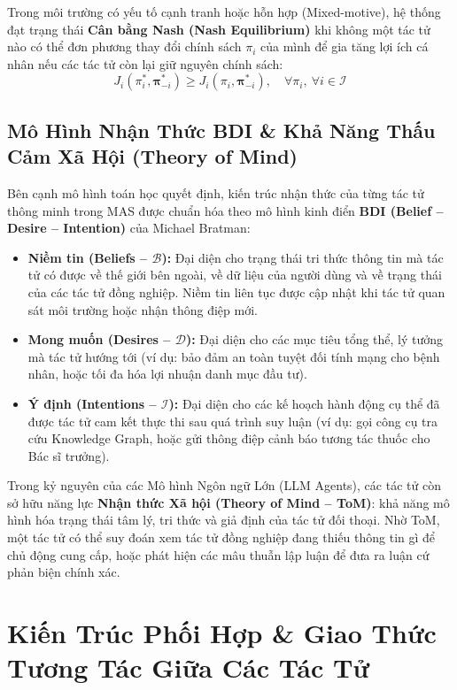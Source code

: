 \documentclass[12pt,a4paper]{report}
\begin{document}
Trong môi trường có yếu tố cạnh tranh hoặc hỗn hợp (Mixed-motive), hệ thống đạt trạng thái \textbf{Cân bằng Nash (Nash Equilibrium)} khi không một tác tử nào có thể đơn phương thay đổi chính sách $\pi_i$ của mình để gia tăng lợi ích cá nhân nếu các tác tử còn lại giữ nguyên chính sách:
\begin{equation}
    J_i(\pi_i^*, \boldsymbol{\pi}_{-i}^*) \ge J_i(\pi_i, \boldsymbol{\pi}_{-i}^*), \quad \forall \pi_i, \ \forall i \in \mathcal{I}
\end{equation}

\subsection{Mô Hình Nhận Thức BDI \& Khả Năng Thấu Cảm Xã Hội (Theory of Mind)}
Bên cạnh mô hình toán học quyết định, kiến trúc nhận thức của từng tác tử thông minh trong MAS được chuẩn hóa theo mô hình kinh điển \textbf{BDI (Belief -- Desire -- Intention)} của Michael Bratman:
\begin{itemize}[leftmargin=1.2cm]
    \item \textbf{Niềm tin (Beliefs -- $\mathcal{B}$):} Đại diện cho trạng thái tri thức thông tin mà tác tử có được về thế giới bên ngoài, về dữ liệu của người dùng và về trạng thái của các tác tử đồng nghiệp. Niềm tin liên tục được cập nhật khi tác tử quan sát môi trường hoặc nhận thông điệp mới.
    \item \textbf{Mong muốn (Desires -- $\mathcal{D}$):} Đại diện cho các mục tiêu tổng thể, lý tưởng mà tác tử hướng tới (ví dụ: bảo đảm an toàn tuyệt đối tính mạng cho bệnh nhân, hoặc tối đa hóa lợi nhuận danh mục đầu tư).
    \item \textbf{Ý định (Intentions -- $\mathcal{I}$):} Đại diện cho các kế hoạch hành động cụ thể đã được tác tử cam kết thực thi sau quá trình suy luận (ví dụ: gọi công cụ tra cứu Knowledge Graph, hoặc gửi thông điệp cảnh báo tương tác thuốc cho Bác sĩ trưởng).
\end{itemize}

Trong kỷ nguyên của các Mô hình Ngôn ngữ Lớn (LLM Agents), các tác tử còn sở hữu năng lực \textbf{Nhận thức Xã hội (Theory of Mind -- ToM)}: khả năng mô hình hóa trạng thái tâm lý, tri thức và giả định của tác tử đối thoại. Nhờ ToM, một tác tử có thể suy đoán xem tác tử đồng nghiệp đang thiếu thông tin gì để chủ động cung cấp, hoặc phát hiện các mâu thuẫn lập luận để đưa ra luận cứ phản biện chính xác.

\section{Kiến Trúc Phối Hợp \& Giao Thức Tương Tác Giữa Các Tác Tử}
\end{document}

